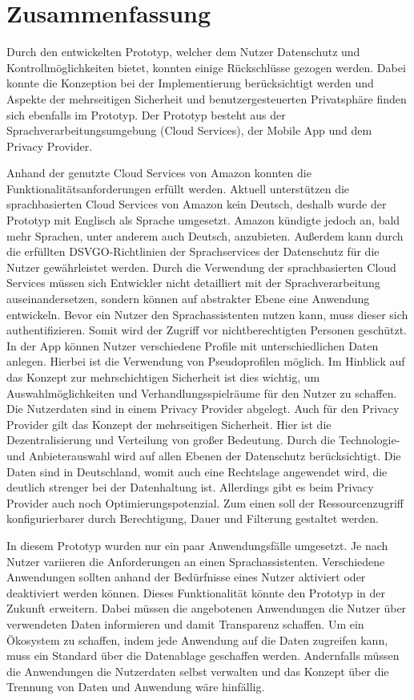 \section{Zusammenfassung}

Durch den entwickelten Prototyp, welcher dem Nutzer Datenschutz und Kontrollmöglichkeiten bietet, konnten einige Rückschlüsse gezogen werden. Dabei konnte die Konzeption bei der Implementierung berücksichtigt werden und Aspekte der mehrseitigen Sicherheit und benutzergesteuerten Privatsphäre finden sich ebenfalls im Prototyp. Der Prototyp besteht aus der Sprachverarbeitungsumgebung (Cloud Services), der Mobile App und dem Privacy Provider.

Anhand der genutzte Cloud Services von Amazon konnten die Funktionalitätsanforderungen erfüllt werden. Aktuell unterstützen die sprachbasierten Cloud Services von Amazon kein Deutsch, deshalb wurde der Prototyp mit Englisch als Sprache umgesetzt. Amazon kündigte jedoch an, bald mehr Sprachen, unter anderem auch Deutsch, anzubieten. Außerdem kann durch die erfüllten DSVGO-Richtlinien der Sprachservices der Datenschutz für die Nutzer gewährleistet werden. Durch die Verwendung der sprachbasierten Cloud Services müssen sich Entwickler nicht detailliert mit der Sprachverarbeitung auseinandersetzen, sondern können auf abstrakter Ebene eine Anwendung entwickeln.  
Bevor ein Nutzer den Sprachassistenten nutzen kann, muss dieser sich authentifizieren. Somit wird der Zugriff vor nichtberechtigten Personen geschützt. In der App können Nutzer verschiedene Profile mit unterschiedlichen Daten anlegen. Hierbei ist die Verwendung von Pseudoprofilen möglich. Im Hinblick auf das Konzept zur mehrschichtigen Sicherheit ist dies wichtig, um Auswahlmöglichkeiten und Verhandlungsspielräume für den Nutzer zu schaffen. Die Nutzerdaten sind in einem Privacy Provider abgelegt. Auch für den Privacy Provider gilt das Konzept der mehrseitigen Sicherheit. Hier ist die Dezentralisierung und Verteilung von großer Bedeutung. Durch die Technologie- und Anbieterauswahl wird auf allen Ebenen der Datenschutz berücksichtigt. Die Daten sind in Deutschland, womit auch eine Rechtslage angewendet wird, die deutlich strenger bei der Datenhaltung ist. Allerdings gibt es beim Privacy Provider auch noch Optimierungspotenzial. Zum einen soll der Ressourcenzugriff konfigurierbarer durch Berechtigung, Dauer und Filterung gestaltet werden. 

In diesem Prototyp wurden nur ein paar Anwendungsfälle umgesetzt. Je nach Nutzer variieren die Anforderungen an einen Sprachassistenten. Verschiedene Anwendungen sollten anhand der Bedürfnisse eines Nutzer aktiviert oder deaktiviert werden können. Dieses Funktionalität könnte den Prototyp in der Zukunft erweitern. Dabei müssen die angebotenen Anwendungen die Nutzer über verwendeten Daten informieren und damit Transparenz  schaffen. Um ein Ökosystem zu schaffen, indem jede Anwendung auf die Daten zugreifen kann, muss ein Standard über die Datenablage geschaffen werden. Andernfalls müssen die Anwendungen die Nutzerdaten selbst verwalten und das Konzept über die Trennung von Daten und Anwendung wäre hinfällig. 

